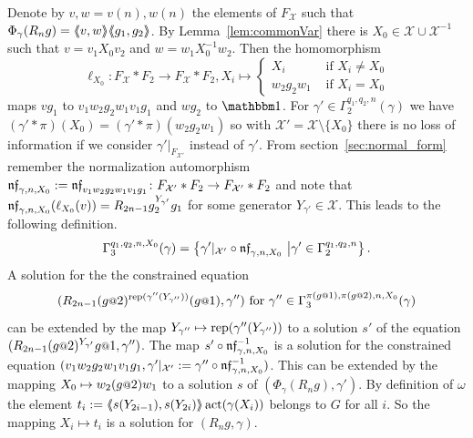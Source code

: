\documentclass[a4paper,11pt]{amsart}
\begin{document}
 Denote by $v,w=v(n),w(n)$ the elements of $F_{\mathcal X}$ such that $\Phi_\gamma(R_ng)=\langle\negthickspace\langle v,w\rangle\negthickspace\rangle\langle\negthickspace\langle g_1,g_2\rangle\negthickspace\rangle$.
 By Lemma~\ref{lem:commonVar} there is 
 $X_0 \in \mathcal{X}\cup \mathcal{X}^{-1}$ such that $v=v_1X_0v_2$ and $w=w_1X_0^{-1}w_2$. Then the homomorphism
 \[\ell_{X_0}\colon F_{\mathcal{X}}*F_2\to F_{\mathcal{X}}*F_2, X_i \mapsto \begin{cases}
     X_i &\text{ if } X_i\neq {X_0} \\
     w_2g_2w_1 &\text{ if }X_i= {X_0} 
   \end{cases}
 \]
 maps $vg_1$ to $v_1w_2g_2w_1v_1g_1$ and $wg_2$ to $\id$.  For
 $\gamma'\in \Gamma_2^{q_1,q_2,n}(\gamma)$ we have
 $(\gamma'*\pi)(X_0)=({\gamma'*\pi})(w_2g_2w_1)$ so with
 $\mathcal X'=\mathcal X\setminus\{X_0\}$ there is no loss of information if we consider
 $\gamma'|_{F_{\mathcal X'}}$ instead of $\gamma'$.  From
 section~\ref{sec:normal_form} remember the normalization automorphism
 $\mathfrak{nf}_{\gamma,n,X_0}:=\mathfrak{nf}_{v_1w_2g_2w_1v_1g_1}\colon F_{\mathcal X'}*F_2 \to
 F_{\mathcal X'}*F_2$ and note that
 $\mathfrak{nf}_{\gamma,n,X_0}(\ell_{X_0}(v))=R_{2n-1}g_2^{{Y_{\gamma'}}}g_1$
 for some generator ${Y_{\gamma'}}\in\mathcal{X}$.  This leads to the
 following definition.
 \[\Gamma_3^{q_1,q_2,n,X_0}(\gamma) = \left\{\gamma'|_{\mathcal X'} \circ \mathfrak{nf}_{\gamma,n,X_0} \ \middle \vert \gamma' \in \Gamma_2^{q_1,q_2,n} \right\}.\] 
 A solution for the the constrained equation
 \[(R_{2n-1}(g\at2)^{\rep(\gamma''({Y_{\gamma''}}))}(g\at1),\gamma'')\textup{
     for }\gamma'' \in \Gamma_3^{\pi(g\at{1}),\pi(g\at{2}),n,X_0}(\gamma)\]
 can be extended by the map
 ${Y_{\gamma''}}\mapsto \operatorname{rep}(\gamma''({Y_{\gamma''}}))$ to a
 solution $s'$ of the equation
 $(R_{2n-1} (g\at{2})^{{Y_{\gamma'}}} g\at{1},\gamma'')$. The map
 $s'\circ \mathfrak{nf}_{\gamma,n,X_0}^{-1}$ is a solution for the constrained
 equation
 $(v_1w_2g_2w_1v_1g_1,\gamma'|_{\mathcal X'}:=\gamma'' \circ
 \mathfrak{nf}_{\gamma,n,X_0}^{-1})$.  This can be extended by the mapping
 $X_0\mapsto w_2(g\at{2})w_1$ to a solution $s$ of
 $(\Phi_\gamma(R_n g),\gamma')$.  By definition of $\omega$ the
 element $t_i:=\langle\negthickspace\langle s(Y_{2i-1}),s(Y_{2i})\rangle\negthickspace\rangle\operatorname{act}(\gamma(X_i))$ belongs
 to $G$ for all $i$. So the mapping $X_i\mapsto t_i$ is a solution for
 $(R_ng,\gamma)$.
 
\end{document}
